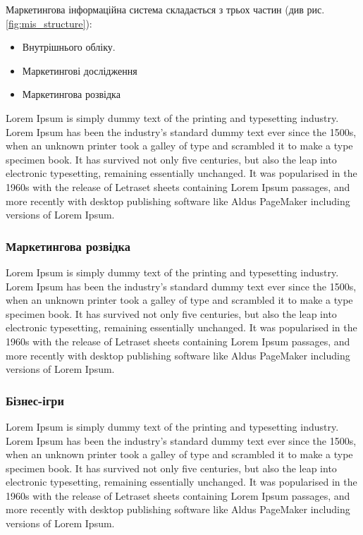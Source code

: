 Маркетингова інформаційна система складається з трьох частин (див рис. \ref{fig:mis_structure}): 
\begin{itemize}
\item Внутрішнього обліку.
\item Маркетингові дослідження
\item Маркетингова розвідка
\end{itemize}

Lorem Ipsum is simply dummy text of the printing and typesetting industry. Lorem Ipsum has been the industry's standard dummy text ever since the 1500s, when an unknown printer took a galley of type and scrambled it to make a type specimen book. It has survived not only five centuries, but also the leap into electronic typesetting, remaining essentially unchanged. It was popularised in the 1960s with the release of Letraset sheets containing Lorem Ipsum passages, and more recently with desktop publishing software like Aldus PageMaker including versions of Lorem Ipsum.

\subsubsection{Маркетингова розвідка}
Lorem Ipsum is simply dummy text of the printing and typesetting industry. Lorem Ipsum has been the industry's standard dummy text ever since the 1500s, when an unknown printer took a galley of type and scrambled it to make a type specimen book. It has survived not only five centuries, but also the leap into electronic typesetting, remaining essentially unchanged. It was popularised in the 1960s with the release of Letraset sheets containing Lorem Ipsum passages, and more recently with desktop publishing software like Aldus PageMaker including versions of Lorem Ipsum.

\subsubsection{Бізнес-ігри}
Lorem Ipsum is simply dummy text of the printing and typesetting industry. Lorem Ipsum has been the industry's standard dummy text ever since the 1500s, when an unknown printer took a galley of type and scrambled it to make a type specimen book. It has survived not only five centuries, but also the leap into electronic typesetting, remaining essentially unchanged. It was popularised in the 1960s with the release of Letraset sheets containing Lorem Ipsum passages, and more recently with desktop publishing software like Aldus PageMaker including versions of Lorem Ipsum.

